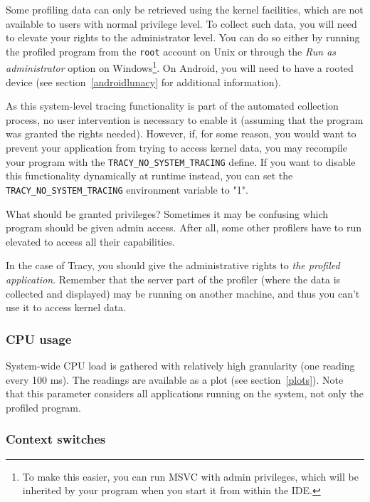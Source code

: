 \documentclass[hidelinks,titlepage,a4paper,twoside]{article}
\begin{document}
Some profiling data can only be retrieved using the kernel facilities, which are not available to users with normal privilege level. To collect such data, you will need to elevate your rights to the administrator level. You can do so either by running the profiled program from the \texttt{root} account on Unix or through the \emph{Run as administrator} option on Windows\footnote{To make this easier, you can run MSVC with admin privileges, which will be inherited by your program when you start it from within the IDE.}. On Android, you will need to have a rooted device (see section~\ref{androidlunacy} for additional information).

As this system-level tracing functionality is part of the automated collection process, no user intervention is necessary to enable it (assuming that the program was granted the rights needed). However, if, for some reason, you would want to prevent your application from trying to access kernel data, you may recompile your program with the \texttt{TRACY\_NO\_SYSTEM\_TRACING} define. If you want to disable this functionality dynamically at runtime instead, you can set the \texttt{TRACY\_NO\_SYSTEM\_TRACING} environment variable to "1".

\begin{bclogo}[
noborder=true,
couleur=black!5,
logo=\bclampe
]{What should be granted privileges?}
Sometimes it may be confusing which program should be given admin access. After all, some other profilers have to run elevated to access all their capabilities.

In the case of Tracy, you should give the administrative rights to \emph{the profiled application}. Remember that the server part of the profiler (where the data is collected and displayed) may be running on another machine, and thus you can't use it to access kernel data.
\end{bclogo}

\subsubsection{CPU usage}

System-wide CPU load is gathered with relatively high granularity (one reading every 100 \si{\milli\second}). The readings are available as a plot (see section~\ref{plots}). Note that this parameter considers all applications running on the system, not only the profiled program.

\subsubsection{Context switches}
\label{contextswitches}
\end{document}
